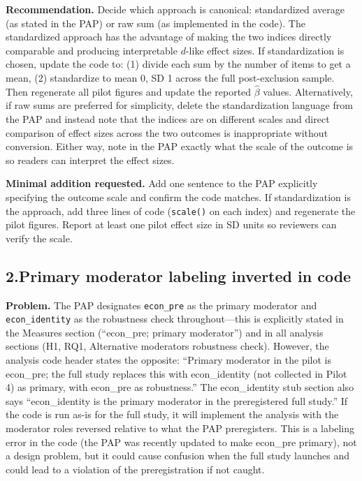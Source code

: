 \documentclass[11pt]{article}
\begin{document}
\textbf{Recommendation.} Decide which approach is canonical: standardized average (as stated in the PAP) or raw sum (as implemented in the code). The standardized approach has the advantage of making the two indices directly comparable and producing interpretable $d$-like effect sizes. If standardization is chosen, update the code to: (1) divide each sum by the number of items to get a mean, (2) standardize to mean 0, SD 1 across the full post-exclusion sample. Then regenerate all pilot figures and update the reported $\hat{\beta}$ values. Alternatively, if raw sums are preferred for simplicity, delete the standardization language from the PAP and instead note that the indices are on different scales and direct comparison of effect sizes across the two outcomes is inappropriate without conversion. Either way, note in the PAP exactly what the scale of the outcome is so readers can interpret the effect sizes.

\textbf{Minimal addition requested.} Add one sentence to the PAP explicitly specifying the outcome scale and confirm the code matches. If standardization is the approach, add three lines of code (\texttt{scale()} on each index) and regenerate the pilot figures. Report at least one pilot effect size in SD units so reviewers can verify the scale.

\bigskip

\subsection*{2.\enspace Primary moderator labeling inverted in code}

\textbf{Problem.} The PAP designates \texttt{econ\_pre} as the primary moderator and \texttt{econ\_identity} as the robustness check throughout---this is explicitly stated in the Measures section (``econ\_pre; primary moderator'') and in all analysis sections (H1, RQ1, Alternative moderators robustness check). However, the analysis code header states the opposite: ``Primary moderator in the pilot is econ\_pre; the full study replaces this with econ\_identity (not collected in Pilot 4) as primary, with econ\_pre as robustness.'' The econ\_identity stub section also says ``econ\_identity is the primary moderator in the preregistered full study.'' If the code is run as-is for the full study, it will implement the analysis with the moderator roles reversed relative to what the PAP preregisters. This is a labeling error in the code (the PAP was recently updated to make econ\_pre primary), not a design problem, but it could cause confusion when the full study launches and could lead to a violation of the preregistration if not caught.
\end{document}
